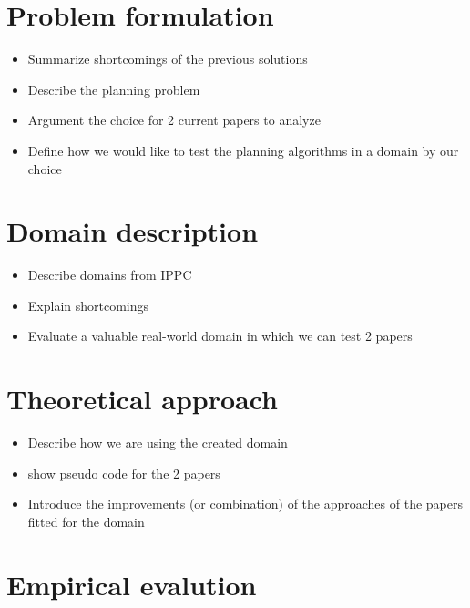 \documentclass[runningheads,a4paper]{llncs}
\begin{document}

\section{Problem formulation}
\begin{itemize}
	\item Summarize shortcomings of the previous solutions
	\item Describe the planning problem
	\item Argument the choice for 2 current papers to analyze
	\item Define how we would like to test the planning algorithms in a domain by our choice
\end{itemize}


\section{Domain description}

\begin{itemize}
	\item Describe domains from IPPC
	\item Explain shortcomings
	\item Evaluate a valuable real-world domain in which we can test 2 papers
\end{itemize}


\section{Theoretical approach}

\begin{itemize}
	\item Describe how we are using the created domain
	\item show pseudo code for the 2 papers
	\item Introduce the improvements (or combination) of the approaches of the papers fitted for the domain
\end{itemize}


\section{Empirical evalution}
\end{document}

